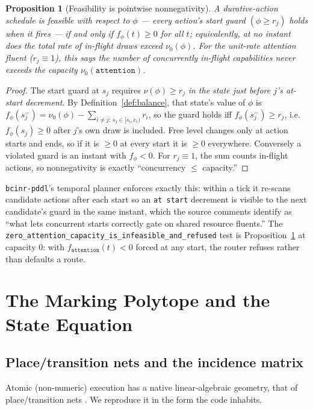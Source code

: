 \documentclass[11pt,oneside]{book}
\theoremstyle{definition}
\theoremstyle{plain}
\newtheorem{proposition}[theorem]{Proposition}
\theoremstyle{remark}
\newcommand{\code}[1]{\texttt{#1}}
\begin{document}
\begin{proposition}[Feasibility is pointwise nonnegativity]\label{prop:balance}
A durative-action schedule is feasible with respect to $\phi$ --- every action's start guard
$(\phi\ge r_j)$ holds when it fires --- if and only if $f_\phi(t)\ge 0$ for all $t$;
equivalently, at no instant does the total rate of in-flight draws exceed $\nu_0(\phi)$. For the
unit-rate attention fluent ($r_j\equiv1$), this says the number of concurrently in-flight
capabilities never exceeds the capacity $\nu_0(\code{attention})$.
\end{proposition}

\begin{proof}
The start guard at $s_j$ requires $\nu(\phi)\ge r_j$ \emph{in the state just before $j$'s
at-start decrement}. By Definition~\ref{def:balance}, that state's value of $\phi$ is
$f_\phi(s_j^{-})=\nu_0(\phi)-\sum_{i\neq j:\,s_j\in[s_i,e_i)} r_i$, so the guard holds iff
$f_\phi(s_j^{-})\ge r_j$, i.e.\ $f_\phi(s_j)\ge 0$ after $j$'s own draw is included. Free level
changes only at action starts and ends, so if it is $\ge 0$ at every start it is $\ge 0$
everywhere. Conversely a violated guard is an instant with $f_\phi<0$. For $r_j\equiv 1$, the
sum counts in-flight actions, so nonnegativity is exactly ``concurrency $\le$ capacity.''
\end{proof}

\code{bcinr-pddl}'s temporal planner enforces exactly this: within a tick it re-scans
candidate actions after each start so an \code{at start} decrement is visible to the next
candidate's guard in the same instant, which the source comments identify as ``what lets
concurrent starts correctly gate on shared resource fluents.'' The
\code{zero\_attention\_capacity\_is\_infeasible\_and\_refused} test is
Proposition~\ref{prop:balance} at capacity $0$: with $f_{\code{attention}}(t)<0$ forced at any
start, the router refuses rather than defaults a route.

\chapter{The Marking Polytope and the State Equation}
\label{ch:polytope}

\section{Place/transition nets and the incidence matrix}

Atomic (non-numeric) execution has a native linear-algebraic geometry, that of place/transition
nets \cite{murata1989}. We reproduce it in the form the code inhabits.
\end{document}
